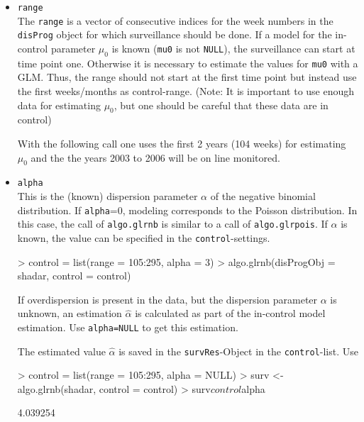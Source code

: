 \documentclass[a4paper,11pt]{article}
\begin{document}
\begin{itemize}
\item \verb+range+ \\
The \verb+range+ is a vector of consecutive indices for the week numbers in the \verb+disProg+ object for which surveillance should be done. If a model for the in-control parameter $\mu_0$ is known (\verb+mu0+ is not \verb+NULL+), the surveillance can start at time point one. Otherwise it is necessary to estimate the values for \verb+mu0+ with a GLM. Thus, the range should not start at the first time point but instead use the first weeks/months as control-range. (Note: It is important to use enough data for estimating $\mu_0$, but one should be careful that these data are in control)

With the following call one uses the first 2 years (104 weeks) for estimating $\mu_0$ and the the years 2003 to 2006 will be on line monitored.
\begin{Schunk}
\end{Schunk}

\item \verb+alpha+ \\
This is the (known) dispersion parameter $\alpha$ of the negative binomial distribution. If \verb+alpha+=0, modeling corresponds to the Poisson distribution. In this case, the call of \verb+algo.glrnb+ is similar to a call of \verb+algo.glrpois+. If $\alpha$ is known, the value can be specified in the \verb+control+-settings.

\begin{Schunk}
\begin{Sinput}
> control = list(range = 105:295, alpha = 3)
> algo.glrnb(disProgObj = shadar, control = control)
\end{Sinput}
\end{Schunk}

If overdispersion is present in the data, but the dispersion parameter $\alpha$ is unknown, an estimation $\hat{\alpha}$ is calculated as part of the in-control model estimation. Use \verb+alpha=NULL+ to get this estimation. 


The estimated value $\hat{\alpha}$ is saved in the \verb+survRes+-Object in the \verb+control+-list. Use

\begin{Schunk}
\begin{Sinput}
> control = list(range = 105:295, alpha = NULL)
> surv <- algo.glrnb(shadar, control = control)
> surv$control$alpha
\end{Sinput}
\begin{Soutput}
[1] 4.039254
\end{Soutput}
\end{Schunk}


\end{itemize}
\end{document}
